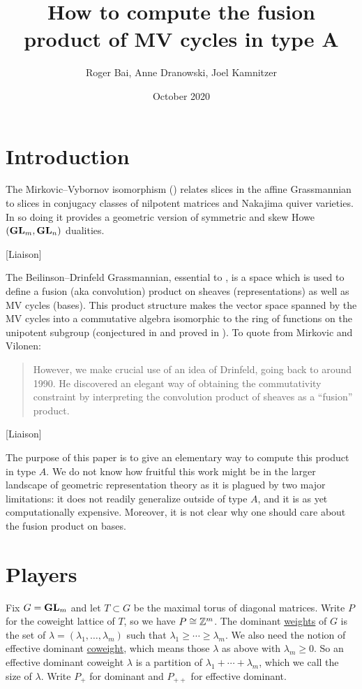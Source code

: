 \documentclass[draft]{article}
\title{How to compute the fusion product of MV cycles in type A}
\author{Roger Bai, Anne Dranowski, Joel Kamnitzer}
\date{October 2020}
\begin{document}
\maketitle

\section{Introduction}
% 
The Mirkovic--Vybornov isomorphism (\cite{mirkovic2007quiver,mirkovic2019comparison}) relates slices in the affine Grassmannian to slices in conjugacy classes of nilpotent matrices and Nakajima quiver varieties. In so doing it provides a geometric version of symmetric and skew Howe $({\mathbf{GL}}_m,{\mathbf{GL}}_n)$ dualities. 
% 

[Liaison]

The Beilinson--Drinfeld Grassmannian, essential to \cite{mirkovic2007geometric}, is a space which is used to define a fusion (aka convolution) product on sheaves (representations) as well as MV cycles (bases). 
% 
This product structure makes the vector space spanned by the MV cycles into a commutative algebra isomorphic to the ring of functions on the unipotent subgroup (conjectured in \cite{anderson2003polytope} and proved in \cite{baumann2019mirkovic}). %
% 
To quote from Mirkovic and Vilonen:
\begin{quotation}
    However, we make crucial use of an idea of Drinfeld, going back to around 1990. He discovered an elegant way of obtaining the commutativity constraint by interpreting the convolution product of sheaves as a ``fusion'' product.
\end{quotation}
% 
[Liaison]

The purpose of this paper is to give an elementary way to compute this product in type $A$. We do not know how fruitful this work might be in the larger landscape of geometric representation theory as it is plagued by two major limitations: it does not readily generalize outside of type $A$, and it is as yet computationally expensive. 
% 
Moreover, it is not clear why one should care about the fusion product on bases.     

\section{Players}

Fix $G = {\mathbf{GL}}_m$ and let $T\subset G$ be the maximal torus of diagonal matrices. 
Write $P$ for the coweight lattice of $T$, so we have $P\cong \mathbb Z^m$.  The dominant \ul{weights} of $ G $ is the set of $ \lambda = (\lambda_1, \dots, \lambda_m) $ such that $ \lambda_1 \ge \cdots \ge \lambda_m$.  We also need the notion of effective dominant \ul{coweight}, 
which means those $ \lambda $ as above with $ \lambda_m \ge 0$.  So an effective dominant coweight $ \lambda $ is a partition of $ \lambda_1 + \cdots + \lambda_m$, which we call the size of $ \lambda$. Write $P_+$ for dominant and $P_{++}$ for effective dominant. 
\end{document}
